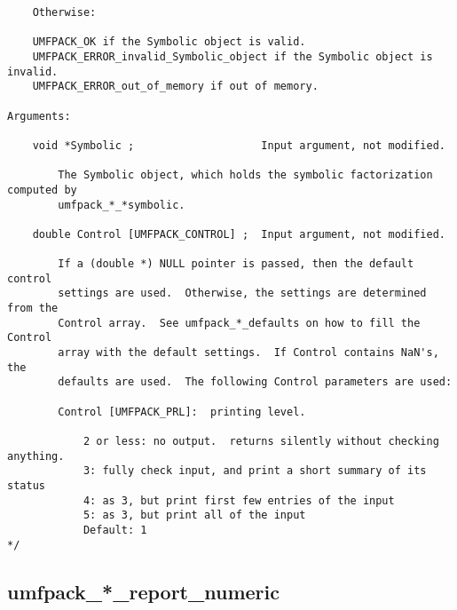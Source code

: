 \documentclass[11pt]{article}
\begin{document}
{\begin{verbatim}
    Otherwise:

    UMFPACK_OK if the Symbolic object is valid.
    UMFPACK_ERROR_invalid_Symbolic_object if the Symbolic object is invalid.
    UMFPACK_ERROR_out_of_memory if out of memory.

Arguments:

    void *Symbolic ;                    Input argument, not modified.

        The Symbolic object, which holds the symbolic factorization computed by
        umfpack_*_*symbolic.

    double Control [UMFPACK_CONTROL] ;  Input argument, not modified.

        If a (double *) NULL pointer is passed, then the default control
        settings are used.  Otherwise, the settings are determined from the
        Control array.  See umfpack_*_defaults on how to fill the Control
        array with the default settings.  If Control contains NaN's, the
        defaults are used.  The following Control parameters are used:

        Control [UMFPACK_PRL]:  printing level.

            2 or less: no output.  returns silently without checking anything.
            3: fully check input, and print a short summary of its status
            4: as 3, but print first few entries of the input
            5: as 3, but print all of the input
            Default: 1
*/
\end{verbatim}
}

\newpage
\subsection{umfpack\_*\_report\_numeric}
\end{document}
